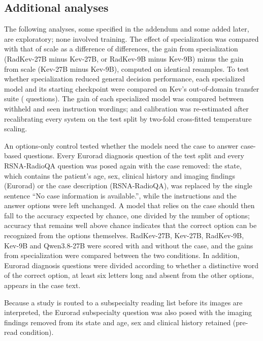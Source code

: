 \documentclass[11pt]{article}
\begin{document}
\FloatBarrier
\subsection{Additional analyses}\label{sec:additional}

The following analyses, some specified in the addendum and some added later, are exploratory; none involved training. The effect of specialization was compared with that of scale as a difference of differences, the gain from specialization (RadKev-27B minus Kev-27B, or RadKev-9B minus Kev-9B) minus the gain from scale (Kev-27B minus Kev-9B), computed on identical resamples. To test whether specialization reduced general decision performance, each specialized model and its starting checkpoint were compared on Kev's out-of-domain transfer suite ( questions). The gain of each specialized model was compared between withheld and seen instruction wordings; and calibration was re-estimated after recalibrating every system on the test split by two-fold cross-fitted temperature scaling.

An options-only control tested whether the models need the case to answer case-based questions. Every Eurorad diagnosis question of the test split and every RSNA-RadioQA question was posed again with the case removed: the state, which contains the patient's age, sex, clinical history and imaging findings (Eurorad) or the case description (RSNA-RadioQA), was replaced by the single sentence ``No case information is available.'', while the instructions and the answer options were left unchanged. A model that relies on the case should then fall to the accuracy expected by chance, one divided by the number of options; accuracy that remains well above chance indicates that the correct option can be recognized from the options themselves. RadKev-27B, Kev-27B, RadKev-9B, Kev-9B and Qwen3.8-27B were scored with and without the case, and the gains from specialization were compared between the two conditions. In addition, Eurorad diagnosis questions were divided according to whether a distinctive word of the correct option, at least six letters long and absent from the other options, appears in the case text.

Because a study is routed to a subspecialty reading list before its images are interpreted, the Eurorad subspecialty question was also posed with the imaging findings removed from its state and age, sex and clinical history retained (pre-read condition).
\end{document}
